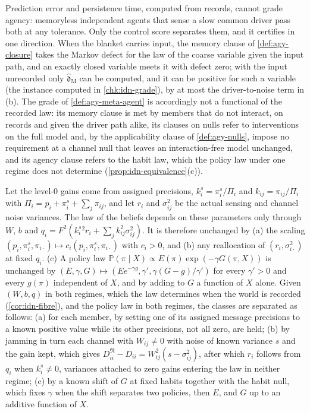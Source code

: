 Prediction error and persistence time, computed from records, cannot grade agency: memoryless independent agents that sense a slow common driver pass both at any tolerance. Only the control score separates them, and it certifies in one direction. When the blanket carries input, the memory clause of \cref{def:agy-closure} takes the Markov defect for the law of the coarse variable given the input path, and an exactly closed variable meets it with defect zero; with the input unrecorded only $\hat{\mathfrak d}_{\mathrm M}$ can be computed, and it can be positive for such a variable (the instance computed in \cref{chk:idn-grade}), by at most the driver-to-noise term in (b). The grade of \cref{def:agy-meta-agent} is accordingly not a functional of the recorded law: its memory clause is met by members that do not interact, on records and given the driver path alike, its clauses on nulls refer to interventions on the full model and, by the applicability clause of \cref{def:agy-nulls}, impose no requirement at a channel null that leaves an interaction-free model unchanged, and its agency clause refers to the habit law, which the policy law under one regime does not determine (\cref{prop:idn-equivalence}(c)).

\begin{proposition}\label{prop:idn-equivalence}
Let the level-0 gains come from assigned precisions, $k^s_i=\pi^s_i/\Pi_i$ and $k_{ij}=\pi_{ij}/\Pi_i$ with $\Pi_i=p_i+\pi^s_i+\sum_j\pi_{ij}$, and let $r_i$ and $\sigma_{ij}^2$ be the actual sensing and channel noise variances. The law of the beliefs depends on these parameters only through $W$, $b$ and $q_i=F^2(k^s_i{}^2r_i+\sum_jk_{ij}^2\sigma_{ij}^2)$. It is therefore unchanged by (a) the scaling $(p_i,\pi^s_i,\pi_{i\cdot})\mapsto c_i(p_i,\pi^s_i,\pi_{i\cdot})$ with $c_i>0$, and (b) any reallocation of $(r_i,\sigma_{i\cdot}^2)$ at fixed $q_i$. (c) A policy law $\mathbb P(\pi\mid X)\propto E(\pi)\exp(-\gamma G(\pi,X))$ is unchanged by $(E,\gamma,G)\mapsto(Ee^{-\gamma g},\gamma',\gamma(G-g)/\gamma')$ for every $\gamma'>0$ and every $g(\pi)$ independent of $X$, and by adding to $G$ a function of $X$ alone. Given $(W,b,q)$ in both regimes, which the law determines when the world is recorded (\cref{cor:idn-fibre}), and the policy law in both regimes, the classes are separated as follows: (a) for each member, by setting one of its assigned message precisions to a known positive value while its other precisions, not all zero, are held; (b) by jamming in turn each channel with $W_{ij}\neq0$ with noise of known variance $s$ and the gain kept, which gives $D^{\mathfrak N}_{ii}-D_{ii}=W_{ij}^2(s-\sigma_{ij}^2)$, after which $r_i$ follows from $q_i$ when $k^s_i\neq0$, variances attached to zero gains entering the law in neither regime; (c) by a known shift of $G$ at fixed habits together with the habit null, which fixes $\gamma$ when the shift separates two policies, then $E$, and $G$ up to an additive function of $X$.
\end{proposition}


